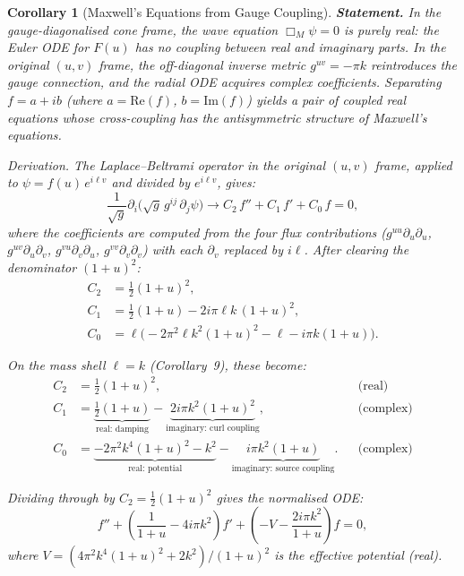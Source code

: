 \documentclass[12pt]{amsart}
\newtheorem{corollary}{Corollary}
\begin{document}
\begin{corollary}[Maxwell's Equations from Gauge Coupling]
\textbf{Statement.} In the gauge-diagonalised cone frame, the wave equation $\Box_M \psi = 0$
is purely real: the Euler ODE for $F(u)$ has no coupling between real and imaginary parts. In
the original $(u,v)$ frame, the off-diagonal inverse metric $g^{uv} = -\pi k$ reintroduces
the gauge connection, and the radial ODE acquires complex coefficients. Separating $f = a + ib$
(where $a = \mathrm{Re}(f)$, $b = \mathrm{Im}(f)$) yields a pair of coupled real equations
whose cross-coupling has the antisymmetric structure of Maxwell's equations.

\textit{Derivation.} The Laplace--Beltrami operator in the original $(u,v)$ frame, applied to
$\psi = f(u)\, e^{i\ell v}$ and divided by $e^{i\ell v}$, gives:
\[
  \frac{1}{\sqrt{g}} \partial_i\bigl(\sqrt{g}\, g^{ij}\, \partial_j\psi\bigr)
    \longrightarrow C_2\, f'' + C_1\, f' + C_0\, f = 0,
\]
where the coefficients are computed from the four flux contributions
($g^{uu}\partial_u\partial_u$, $g^{uv}\partial_u\partial_v$, $g^{vu}\partial_v\partial_u$,
$g^{vv}\partial_v\partial_v$) with each $\partial_v$ replaced by $i\ell$. After clearing the
denominator $(1+u)^2$:
\begin{align}
  C_2 &= \tfrac{1}{2}(1+u)^2, \\
  C_1 &= \tfrac{1}{2}(1+u) - 2i\pi\ell k\,(1+u)^2, \\
  C_0 &= \ell\bigl(-2\pi^2\ell k^2(1+u)^2 - \ell - i\pi k(1+u)\bigr).
\end{align}

On the mass shell $\ell = k$ (Corollary~9), these become:
\begin{align*}
  C_2 &= \tfrac{1}{2}(1+u)^2, & &\text{(real)} \\
  C_1 &= \underbrace{\tfrac{1}{2}(1+u)}_{\text{real: damping}}
    - \underbrace{2i\pi k^2(1+u)^2}_{\text{imaginary: curl coupling}}, & &\text{(complex)} \\
  C_0 &= \underbrace{-2\pi^2 k^4(1+u)^2 - k^2}_{\text{real: potential}}
    - \underbrace{i\pi k^2(1+u)}_{\text{imaginary: source coupling}}. & &\text{(complex)}
\end{align*}

Dividing through by $C_2 = \tfrac{1}{2}(1+u)^2$ gives the normalised ODE:
\[
  f'' + \left(\frac{1}{1+u} - 4i\pi k^2\right) f'
    + \left(-V - \frac{2i\pi k^2}{1+u}\right) f = 0,
\]
where $V = (4\pi^2 k^4(1+u)^2 + 2k^2)/(1+u)^2$ is the effective potential (real).


\end{corollary}
\end{document}
